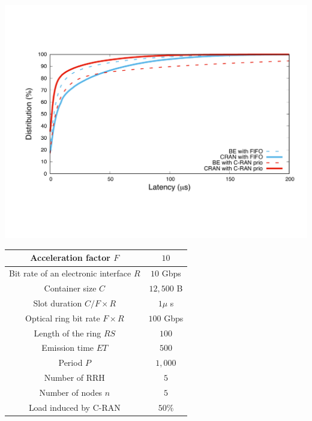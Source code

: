 \documentclass[]{algotel}
\begin{document}
    \begin{minipage}[b]{0.50\linewidth}


        \begin{center}
      \includegraphics[scale=0.3]{opport.pdf}

          \label{fig:resultopport}
      \end{center} 
  \end{minipage}
\hfill
  \begin{minipage}[b]{0.40\linewidth}
  \vspace{-2cm}
  \scalebox{0.7}
  {
  \centering
  \begin{tabular}{|c|c|}
  \hline
 Acceleration factor $F$ & $10$  \tabularnewline
  \hline
  Bit rate of an electronic interface $R$ & $10$ Gbps \tabularnewline
  \hline
  Container size  $C$ & $12,500$ B  \tabularnewline
  \hline
  Slot duration $C/F\times R$ & $1\mu$ s \tabularnewline
  \hline
  Optical ring bit rate $F\times R$ & $100$ Gbps \tabularnewline
  \hline
  Length of the ring $RS$ & $100$ \tabularnewline
  \hline
  Emission time $ET$ & $500$ \tabularnewline
  \hline
   Period $P$ & $1,000$ \tabularnewline
  \hline
  Number of RRH & $5$  \tabularnewline
  \hline
  Number of nodes $n$ & $5$  \tabularnewline
  \hline
   Load induced by C-RAN & $50\%$  \tabularnewline
  \hline
  \end{tabular}
  }
  \vspace{0.55cm}
  \label{fig:params}

  \end{minipage} 
  
\end{document}
